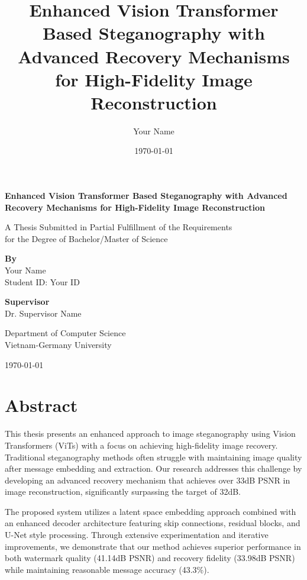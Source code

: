 \documentclass[12pt,a4paper]{report}
\title{Enhanced Vision Transformer Based Steganography with Advanced Recovery Mechanisms for High-Fidelity Image Reconstruction}
\author{Your Name}
\date{\today}
\begin{document}
\begin{titlepage}
    \centering
    \vspace*{1cm}
    
    \Huge
    \textbf{Enhanced Vision Transformer Based Steganography with Advanced Recovery Mechanisms for High-Fidelity Image Reconstruction}
    
    \vspace{0.5cm}
    \LARGE
    A Thesis Submitted in Partial Fulfillment of the Requirements\\
    for the Degree of Bachelor/Master of Science
    
    \vspace{1.5cm}
    
    \textbf{By}\\
    \Large
    Your Name\\
    Student ID: Your ID
    
    \vspace{1.5cm}
    
    \textbf{Supervisor}\\
    \Large
    Dr. Supervisor Name
    
    \vspace{1.5cm}
    
    \Large
    Department of Computer Science\\
    Vietnam-Germany University\\
    
    \vspace{1cm}
    
    \Large
    \today
    
\end{titlepage}

\chapter*{Abstract}

This thesis presents an enhanced approach to image steganography using Vision Transformers (ViTs) with a focus on achieving high-fidelity image recovery. Traditional steganography methods often struggle with maintaining image quality after message embedding and extraction. Our research addresses this challenge by developing an advanced recovery mechanism that achieves over 33dB PSNR in image reconstruction, significantly surpassing the target of 32dB.

The proposed system utilizes a latent space embedding approach combined with an enhanced decoder architecture featuring skip connections, residual blocks, and U-Net style processing. Through extensive experimentation and iterative improvements, we demonstrate that our method achieves superior performance in both watermark quality (41.14dB PSNR) and recovery fidelity (33.98dB PSNR) while maintaining reasonable message accuracy (43.3\%).
\end{document}
